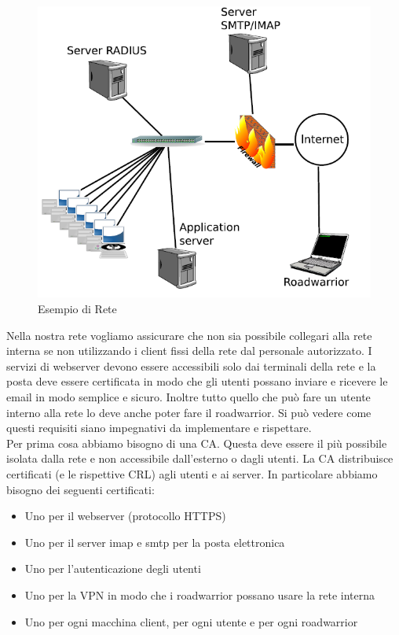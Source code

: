 \begin{figure}[h]
	\centering
	\includegraphics[scale = 0.4]{images/network_example1.png}
	\caption{Esempio di Rete}
	\label{img:network_example1}
\end{figure}

Nella nostra rete vogliamo assicurare che non sia possibile collegari alla rete interna se non utilizzando i client fissi della rete dal personale autorizzato. I servizi di webserver devono essere accessibili solo dai terminali della rete e la posta deve essere certificata in modo che gli utenti possano inviare e ricevere le email in modo semplice e sicuro. Inoltre tutto quello che può fare un utente interno alla rete lo deve anche poter fare il roadwarrior. Si può vedere come questi requisiti siano impegnativi da implementare e rispettare. \\

Per prima cosa abbiamo bisogno di una CA. Questa deve essere il più possibile isolata dalla rete e non accessibile dall'esterno o dagli utenti. La CA distribuisce certificati (e le rispettive CRL) agli utenti e ai server.  In particolare abbiamo bisogno dei seguenti certificati:
\begin{itemize}
\item Uno per il webserver (protocollo HTTPS)
\item Uno per il server imap e smtp per la posta elettronica
\item Uno per l'autenticazione degli utenti
\item Uno per la VPN in modo che i roadwarrior possano usare la rete interna
\item Uno per ogni macchina client, per ogni utente e per ogni roadwarrior
\end{itemize}

